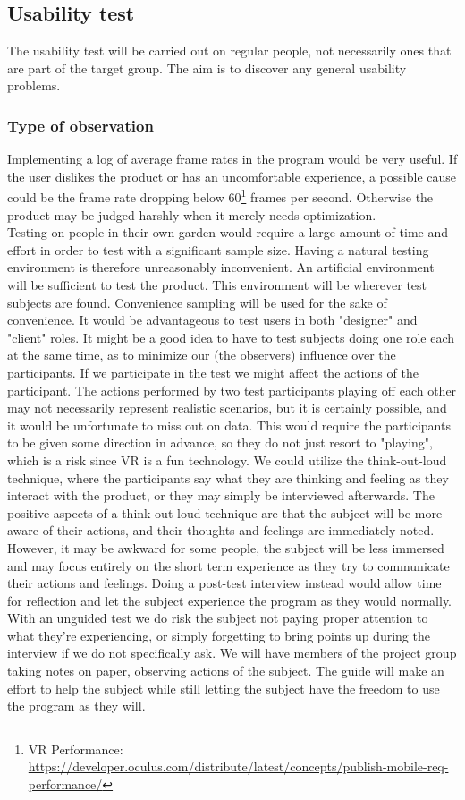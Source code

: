 \subsection{Usability test}

The usability test will be carried out on regular people, not necessarily ones that are part of the target group. The aim is to discover any general usability problems. 

\subsubsection{Type of observation}

Implementing a log of average frame rates in the program would be very useful. If the user dislikes the product or has an uncomfortable experience, a possible cause could be the frame rate dropping below 60\footnote{VR Performance: \url{https://developer.oculus.com/distribute/latest/concepts/publish-mobile-req-performance/}} frames per second. Otherwise the product may be judged harshly when it merely needs optimization.\\
Testing on people in their own garden would require a large amount of time and effort in order to test with a significant sample size. Having a natural testing environment is therefore unreasonably inconvenient. An artificial environment will be sufficient to test the product. This environment will be wherever test subjects are found. Convenience sampling will be used for the sake of convenience.
It would be advantageous to test users in both "designer" and "client" roles. It might be a good idea to have to test subjects doing one role each at the same time, as to minimize our (the observers) influence over the participants. If we participate in the test we might affect the actions of the participant. The actions performed by two test participants playing off each other may not necessarily represent realistic scenarios, but it is certainly possible, and it would be unfortunate to miss out on data. This would require the participants to be given some direction in advance, so they do not just resort to "playing", which is a risk since VR is a fun technology. We could utilize the think-out-loud technique, where the participants say what they are thinking and feeling as they interact with the product, or they may simply be interviewed afterwards.   
The positive aspects of a think-out-loud technique are that the subject will be more aware of their actions, and their thoughts and feelings are immediately noted. However, it may be awkward for some people, the subject will be less immersed and may focus entirely on the short term experience as they try to communicate their actions and feelings. Doing a post-test interview instead would allow time for reflection and let the subject experience the program as they would normally. With an unguided test we do risk the subject not paying proper attention to what they're experiencing, or simply forgetting to bring points up during the interview if we do not specifically ask. We will have members of the project group taking notes on paper, observing actions of the subject. The guide will make an effort to help the subject while still letting the subject have the freedom to use the program as they will.
